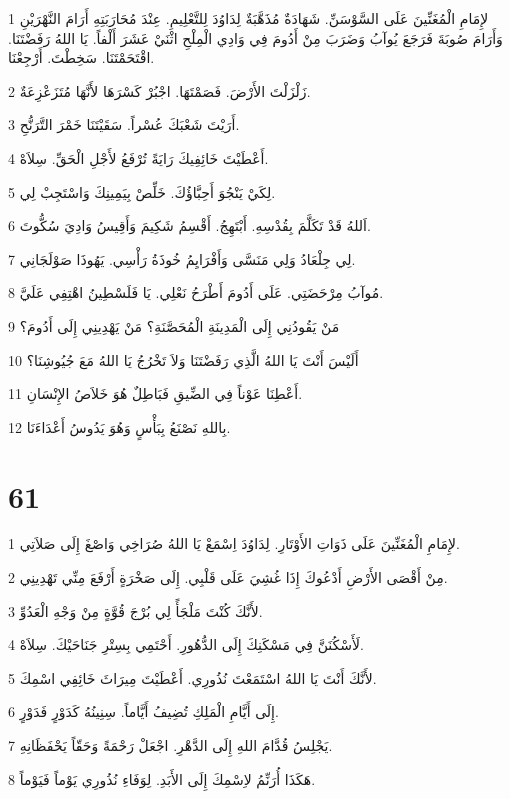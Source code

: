 \par 1 لإِمَامِ الْمُغَنِّينَ عَلَى السَّوْسَنِّ. شَهَادَةٌ مُذَهَّبَةٌ لِدَاوُدَ لِلتَّعْلِيمِ. عِنْدَ مُحَارَبَتِهِ أَرَامَ النَّهْرَيْنِ وَأَرَامَ صُوبَةَ فَرَجَعَ يُوآبُ وَضَرَبَ مِنْ أَدُومَ فِي وَادِي الْمِلْحِ اثْنَيْ عَشَرَ أَلْفاً. يَا اللهُ رَفَضْتَنَا. اقْتَحَمْتَنَا. سَخِطْتَ. أَرْجِعْنَا.
\par 2 زَلْزَلْتَ الأَرْضَ. فَصَمْتَهَا. اجْبُرْ كَسْرَهَا لأَنَّهَا مُتَزَعْزِعَةٌ.
\par 3 أَرَيْتَ شَعْبَكَ عُسْراً. سَقَيْتَنَا خَمْرَ التَّرَنُّحِ.
\par 4 أَعْطَيْتَ خَائِفِيكَ رَايَةً تُرْفَعُ لأَجْلِ الْحَقِّ. سِلاَهْ.
\par 5 لِكَيْ يَنْجُوَ أَحِبَّاؤُكَ. خَلِّصْ بِيَمِينِكَ وَاسْتَجِبْ لِي.
\par 6 اَللهُ قَدْ تَكَلَّمَ بِقُدْسِهِ. أَبْتَهِجُ. أَقْسِمُ شَكِيمَ وَأَقِيسُ وَادِيَ سُكُّوتَ.
\par 7 لِي جِلْعَادُ وَلِي مَنَسَّى وَأَفْرَايِمُ خُوذَةُ رَأْسِي. يَهُوذَا صَوْلَجَانِي.
\par 8 مُوآبُ مِرْحَضَتِي. عَلَى أَدُومَ أَطْرَحُ نَعْلِي. يَا فَلَسْطِينُ اهْتِفِي عَلَيَّ.
\par 9 مَنْ يَقُودُنِي إِلَى الْمَدِينَةِ الْمُحَصَّنَةِ؟ مَنْ يَهْدِينِي إِلَى أَدُومَ؟
\par 10 أَلَيْسَ أَنْتَ يَا اللهُ الَّذِي رَفَضْتَنَا وَلاَ تَخْرُجُ يَا اللهُ مَعَ جُيُوشِنَا؟
\par 11 أَعْطِنَا عَوْناً فِي الضِّيقِ فَبَاطِلٌ هُوَ خَلاَصُ الإِنْسَانِ.
\par 12 بِاللهِ نَصْنَعُ بِبَأْسٍ وَهُوَ يَدُوسُ أَعْدَاءَنَا.

\chapter{61}

\par 1 لإِمَامِ الْمُغَنِّينَ عَلَى ذَوَاتِ الأَوْتَارِ. لِدَاوُدَ اِسْمَعْ يَا اللهُ صُرَاخِي وَاصْغَ إِلَى صَلاَتِي.
\par 2 مِنْ أَقْصَى الأَرْضِ أَدْعُوكَ إِذَا غُشِيَ عَلَى قَلْبِي. إِلَى صَخْرَةٍ أَرْفَعَ مِنِّي تَهْدِينِي.
\par 3 لأَنَّكَ كُنْتَ مَلْجَأً لِي بُرْجَ قُوَّةٍ مِنْ وَجْهِ الْعَدُوِّ.
\par 4 لَأَسْكُنَنَّ فِي مَسْكَنِكَ إِلَى الدُّهُورِ. أَحْتَمِي بِسِتْرِ جَنَاحَيْكَ. سِلاَهْ.
\par 5 لأَنَّكَ أَنْتَ يَا اللهُ اسْتَمَعْتَ نُذُورِي. أَعْطَيْتَ مِيرَاثَ خَائِفِي اسْمِكَ.
\par 6 إِلَى أَيَّامِ الْمَلِكِ تُضِيفُ أَيَّاماً. سِنِينُهُ كَدَوْرٍ فَدَوْرٍ.
\par 7 يَجْلِسُ قُدَّامَ اللهِ إِلَى الدَّهْرِ. اجْعَلْ رَحْمَةً وَحَقّاً يَحْفَظَانِهِ.
\par 8 هَكَذَا أُرَنِّمُ لاِسْمِكَ إِلَى الأَبَدِ. لِوَفَاءِ نُذُورِي يَوْماً فَيَوْماً.

